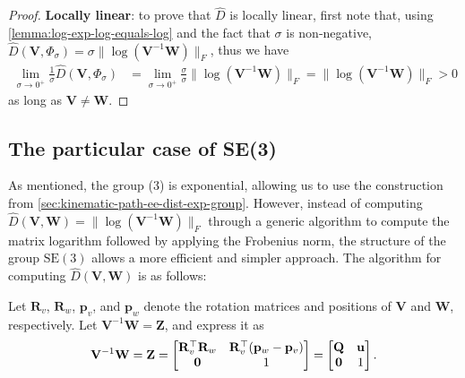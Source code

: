 \begin{proof}
    \textbf{Locally linear}: to prove that $\widehat{D}$ is locally linear, first note that, using \cref{lemma:log-exp-log-equals-log} and the fact that $\sigma$ is non-negative, $\widehat{D}(\mathbf{V}, \Phi_\sigma) = \sigma\|\log{\left(\mathbf{V}^{-1}\mathbf{W}\right)}\|_F$, thus we have
    \begin{align}
            \lim_{\sigma\to0^+}\frac{1}{\sigma}\widehat{D}(\mathbf{V}, \Phi_\sigma) &= \lim_{\sigma\to0^+}\frac{\sigma}{\sigma}\|\log{(\mathbf{V}^{-1}\mathbf{W})}\|_F
            = \|\log{(\mathbf{V}^{-1}\mathbf{W})}\|_F > 0
    \end{align}
    as long as $\mathbf{V} \not= \mathbf{W}$.
\end{proof}

\subsection{The particular case of SE(3)}\label{sec:explicit-construction-SE3}
As mentioned, the group (3) is exponential, allowing us to use the construction from \cref{sec:kinematic-path-ee-dist-exp-group}. However, instead of computing $\widehat{D}(\mathbf{V},\mathbf{W}) = \|\log(\mathbf{V}^{-1}\mathbf{W})\|_F$ through a generic algorithm to compute the matrix logarithm followed by applying the Frobenius norm, the structure of the group $\text{SE}(3)$ allows a more efficient and simpler approach. The algorithm for computing $\widehat{D}(\mathbf{V},\mathbf{W})$ is as follows:

Let $\mathbf{R}_v$, $\mathbf{R}_w$, $\mathbf{p}_v$, and $\mathbf{p}_w$ denote the rotation matrices and positions of $\mathbf{V}$ and $\mathbf{W}$, respectively. Let $\mathbf{V}^{-1}\mathbf{W} = \mathbf{Z}$, and express it as 
\begin{align*}
    \mathbf{V}^{-1}\mathbf{W} = \mathbf{Z} =\begin{bmatrix}
        \mathbf{R}_v^\top\mathbf{R}_w & \textcolor{black}{\mathbf{R}_v^\top}(\mathbf{p}_w - \mathbf{p}_v) \\
        \mathbf{0} & 1
    \end{bmatrix}
    = \begin{bmatrix}
        \mathbf{Q} & \mathbf{u} \\
        \mathbf{0} & 1
    \end{bmatrix}.
\end{align*}

